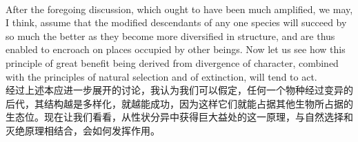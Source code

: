 \documentclass{article}
\begin{document}
\\
After the foregoing discussion, which ought to have been much amplified, we may, I think, assume that the modified descendants of any one species will succeed by so much the better as they become more diversified in structure, and are thus enabled to encroach on places occupied by other beings. Now let us see how this principle of great benefit being derived from divergence of character, combined with the principles of natural selection and of extinction, will tend to act.\\
经过上述本应进一步展开的讨论，我认为我们可以假定，任何一个物种经过变异的后代，其结构越是多样化，就越能成功，因为这样它们就能占据其他生物所占据的生态位。现在让我们看看，从性状分异中获得巨大益处的这一原理，与自然选择和灭绝原理相结合，会如何发挥作用。 \\
\end{document}
